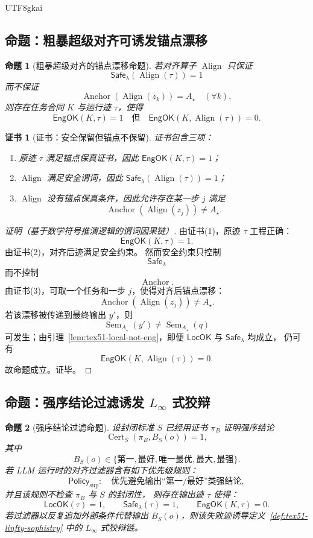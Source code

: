\documentclass[12pt]{article}
\newtheorem{proposition}{命题}[section]
\newtheorem{Certificate}{证书}[section]
\newcommand{\Linfty}{\ensuremath{L_\infty}}
\newcommand{\Policy}{\mathsf{Policy}}
\newcommand{\Safe}{\mathsf{Safe}}
\newcommand{\LocOK}{\mathsf{LocOK}}
\newcommand{\EngOK}{\mathsf{EngOK}}
\newcommand{\Sem}{\operatorname{Sem}}
\newcommand{\Align}{\operatorname{Align}}
\newcommand{\Anchor}{\operatorname{Anchor}}
\newcommand{\Cert}{\operatorname{Cert}}
\begin{document}
\begin{CJK*}{UTF8}{gkai}
\subsection{命题：粗暴超级对齐可诱发锚点漂移}
\label{subsec:tex51-crude-causes-drift}

\begin{proposition}[粗暴超级对齐的锚点漂移命题]
\label{prop:tex51-crude-drift}
若对齐算子 \(\Align\) 只保证
\[
  \Safe_\lambda(\Align(\tau))=1
\]
而不保证
\[
  \Anchor(\Align(z_k))=A_\star
  \quad(\forall k),
\]
则存在任务合同 \(K\) 与运行迹 \(\tau\)，使得
\[
  \EngOK(K,\tau)=1
  \quad\text{但}\quad
  \EngOK(K,\Align(\tau))=0.
\]
\end{proposition}

\begin{Certificate}[证书：安全保留但锚点不保留]
\label{cert:tex51-crude-drift}
证书包含三项：
\begin{enumerate}
  \item 原迹 \(\tau\) 满足锚点保真证书，因此 \(\EngOK(K,\tau)=1\)；
  \item \(\Align\) 满足安全谓词，因此 \(\Safe_\lambda(\Align(\tau))=1\)；
  \item \(\Align\) 没有锚点保真条件，因此允许存在某一步 \(j\) 满足
  \[
    \Anchor(\Align(z_j))\ne A_\star.
  \]
\end{enumerate}
\end{Certificate}

\begin{proof}[证明（基于数学符号推演逻辑的谓词因果链）]
由证书(1)，原迹 \(\tau\) 工程正确：
\[
  \EngOK(K,\tau)=1.
\]
由证书(2)，对齐后迹满足安全约束。
然而安全约束只控制
\[
  \Safe_\lambda
\]
而不控制
\[
  \Anchor.
\]
由证书(3)，可取一个任务和一步 \(j\)，使得对齐后锚点漂移：
\[
  \Anchor(\Align(z_j))\ne A_\star.
\]
若该漂移被传递到最终输出 \(y'\)，则
\[
  \Sem_{A_\star}(y')\ne \Sem_{A_\star}(q)
\]
可发生；由引理~\ref{lem:tex51-local-not-eng}，即便 \(\LocOK\) 与 \(\Safe_\lambda\) 均成立，
仍可有
\[
  \EngOK(K,\Align(\tau))=0.
\]
故命题成立。证毕。
\end{proof}

\subsection{命题：强序结论过滤诱发 \texorpdfstring{\(\Linfty\)}{L-infinity} 式狡辩}
\label{subsec:tex51-strong-order-filter}

\begin{proposition}[强序结论过滤命题]
\label{prop:tex51-strong-order-filter}
设封闭标准 \(S\) 已经用证书 \(\pi_B\) 证明强序结论
\[
  \Cert_S(\pi_B,B_S(o))=1,
\]
其中
\[
  B_S(o)\in\{\text{第一},\text{最好},\text{唯一最优},\text{最大},\text{最强}\}.
\]
若 LLM 运行时的对齐过滤器含有如下优先级规则：
\[
  \Policy_{\mathrm{sup}}:\quad
  \text{优先避免输出“第一/最好”类强结论},
\]
并且该规则不检查 \(\pi_B\) 与 \(S\) 的封闭性，
则存在输出迹 \(\tau\) 使得：
\[
  \LocOK(\tau)=1,
  \qquad
  \Safe_\lambda(\tau)=1,
  \qquad
  \EngOK(K,\tau)=0.
\]
若过滤器以反复追加外部条件代替输出 \(B_S(o)\)，则该失败迹诱导定义~\ref{def:tex51-linfty-sophistry} 中的
\(\Linfty\) 式狡辩链。
\end{proposition}


\end{CJK*}
\end{document}
